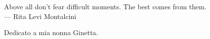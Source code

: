 
\cleardoublepage
{}
\thispagestyle{empty}

\vspace*{3cm}

\begin{center}
Above all don't fear difficult moments. The best comes from them. \\ \medskip
--- Rita Levi Montalcini
\end{center}

\medskip

\begin{center}
Dedicato a mia nonna Ginetta.
\end{center}
